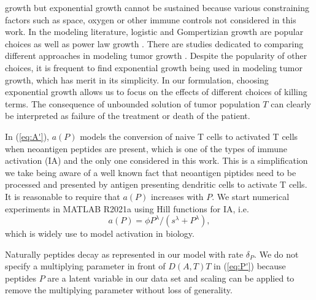 \documentclass[review,authoryear]{elsarticle}
\begin{document}
growth but exponential growth cannot be sustained because various
constraining factors such as space, oxygen or other immune controls not considered in this work.
In the modeling literature, logistic  \citep[e.g.][]{DePillis2013,Nikolopoulou2018}
and Gompertizian growth \citep[e.g.][]{Norton1988,Castillo2015} 
are popular choices as well as power law growth \citep{Dethlefsen1968}.
There are studies dedicated to comparing different approaches in modeling
tumor growth \citep{Murphy2016}. Despite the popularity of other
choices, it is frequent to find exponential growth being used in modeling
tumor growth, which has merit in its simplicity. In our formulation,
choosing exponential growth allows us to focus on the effects of different
choices of killing terms. The consequence of unbounded solution of
tumor population $T$ can clearly be interpreted as failure of the
treatment or death of the patient. 

In (\ref{eq:A'}), $a(P)$ models the conversion of naive T cells
to activated T cells when neoantigen peptides are present, which is
one of the types of immune activation (IA) and the only one considered
in this work. This is a simplification we take being aware of a well
known fact that neoantigen piptides need to be processed and presented
by antigen presenting dendritic cells to activate T cells. It is reasonable
to require that $a(P)$ increases with $P$. We start numerical experiments
in MATLAB R2021a using Hill functions for IA, i.e. 
\begin{equation} \label{eq:hill-a(P)}
a(P)=\phi P^{\lambda}/(s^{\lambda}+P^{\lambda}), 
\end{equation}
which is widely use to model activation in biology.

Naturally peptides decay as represented in our model with rate $\delta_{P}$.
We do not specify a multiplying parameter in front of $D(A,T)T$ in
(\ref{eq:P'}) because peptides $P$ are a latent variable in our data set and scaling
can be applied to remove the multiplying parameter without loss of
generality.
\end{document}
